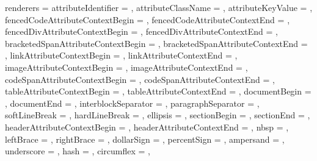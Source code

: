 renderers = {%
  attributeIdentifier = {%
    },
  attributeClassName = {%
    },
  attributeKeyValue = {%
    },
  fencedCodeAttributeContextBegin = {%
    },
  fencedCodeAttributeContextEnd = {%
    },
  fencedDivAttributeContextBegin = {%
    },
  fencedDivAttributeContextEnd = {%
    },
  bracketedSpanAttributeContextBegin = {%
    },
  bracketedSpanAttributeContextEnd = {%
    \GOBBLE},
  linkAttributeContextBegin = {%
    },
  linkAttributeContextEnd = {%
    \GOBBLE},
  imageAttributeContextBegin = {%
    },
  imageAttributeContextEnd = {%
    \GOBBLE},
  codeSpanAttributeContextBegin = {%
    },
  codeSpanAttributeContextEnd = {%
    \GOBBLE},
  tableAttributeContextBegin = {%
    },
  tableAttributeContextEnd = {%
    \GOBBLE},
  documentBegin = {%
    },
  documentEnd = {%
    },
  interblockSeparator = {%
    \GOBBLE},
  paragraphSeparator = {%
    \GOBBLE},
  softLineBreak = {%
    \GOBBLE},
  hardLineBreak = {%
    \GOBBLE},
  ellipsis = {%
    \GOBBLE},
  sectionBegin = {%
    },
  sectionEnd = {%
    },
  headerAttributeContextBegin = {%
    },
  headerAttributeContextEnd = {%
    },
  nbsp = {%
    \GOBBLE},
  leftBrace = {%
    \GOBBLE},
  rightBrace = {%
    \GOBBLE},
  dollarSign = {%
    \GOBBLE},
  percentSign = {%
    \GOBBLE},
  ampersand = {%
    \GOBBLE},
  underscore = {%
    \GOBBLE},
  hash = {%
    \GOBBLE},
  circumflex = {%
    \GOBBLE},
}
